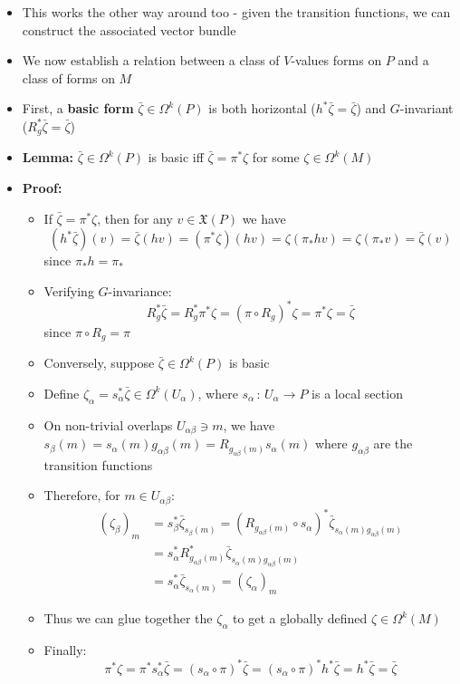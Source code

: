 \documentclass[12pt,a4paper]{article}
\numberwithin{equation}{section}
\begin{document}
\begin{itemize}
		\item This works the other way around too - given the transition functions, we can construct the associated vector bundle
		\item We now establish a relation between a class of $V$-values forms on $P$ and a class of forms on $M$
		\item First, a \textbf{basic form} $\bar{\zeta}\in\Omega^{k}(P)$ is both horizontal ($h^{*}\bar{\zeta}=\bar{\zeta}$) and $G$-invariant ($R_{g}^{*}\bar{\zeta}=\bar{\zeta}$)
		\newcommand{\bz}{\bar{\zeta}}
		\item \textbf{Lemma:} $\bz\in\Omega^{k}(P)$ is basic iff $\bz=\pi^{*}\zeta$ for some $\zeta\in\Omega^{k}(M)$
		\item \textbf{Proof:}
		\begin{itemize}
			\item If $\bz=\pi^{*}\zeta$, then for any $v\in\mathfrak{X}(P)$ we have
			$$
			(h^{*}\bz)(v)=\bz(hv)=(\pi^{*}\zeta)(hv)=\zeta(\pi_{*}hv)=\zeta(\pi_{*}v)=\bz(v)
			$$
			since $\pi_{*}h=\pi_{*}$
			\item Verifying $G$-invariance:
			$$
			R_{g}^{*}\bz=R_{g}^{*}\pi^{*}\zeta=(\pi\circ R_{g})^{*}\zeta=\pi^{*}\zeta=\bz
			$$
			since $\pi\circ R_{g}=\pi$
			\item Conversely, suppose $\bz\in\Omega^{k}(P)$ is basic
			\item Define $\zeta_{\alpha}=s_{\alpha}^{*}\bz\in\Omega^{k}(U_{\alpha})$, where $s_{\alpha}\,:\,U_{\alpha}\to P$ is a local section
			\item On non-trivial overlaps $U_{\alpha\beta}\ni m$, we have $s_{\beta}(m)=s_{\alpha}(m)g_{\alpha\beta}(m)=R_{g_{\alpha\beta}(m)}s_{\alpha}(m)$ where $g_{\alpha\beta}$ are the transition functions
			\item Therefore, for $m\in U_{\alpha\beta}$:
			$$
			\begin{aligned}
				(\zeta_{\beta})_{m}&=s^{*}_{\beta}\bz_{s_{\beta}(m)}=(R_{g_{\alpha\beta}(m)}\circ s_{\alpha})^{*}\bz_{s_{\alpha}(m)g_{\alpha\beta}(m)}\\&=s_{\alpha}^{*}R^{*}_{g_{\alpha\beta}(m)}\bz_{s_{\alpha}(m)g_{\alpha\beta}(m)}\\&=s_{\alpha}^{*}\bz_{s_{\alpha}(m)}=(\zeta_{\alpha})_{m}
			\end{aligned}
			$$
			\item Thus we can glue together the $\zeta_{\alpha}$ to get a globally defined $\zeta\in\Omega^{k}(M)$
			\item Finally:
			$$
			\pi^{*}\zeta=\pi^{*}s_{\alpha}^{*}\bz=(s_{\alpha}\circ\pi)^{*}\bz=(s_{\alpha}\circ\pi)^{*}h^{*}\bz=h^{*}\bz=\bz
$$
\end{itemize}
\end{itemize}
\end{document}
